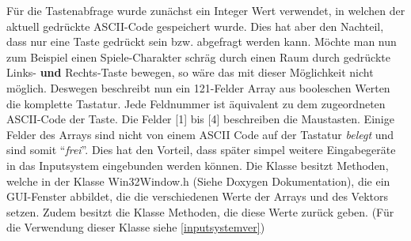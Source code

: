 Für die Tastenabfrage wurde zunächst ein Integer Wert verwendet, in welchen der aktuell gedrückte ASCII-Code gespeichert wurde. Dies hat aber den Nachteil, dass nur eine Taste gedrückt sein bzw. abgefragt werden kann. Möchte man nun zum Beispiel einen Spiele-Charakter schräg durch einen Raum durch gedrückte Links- \textbf{und} Rechts-Taste bewegen, so wäre das mit dieser Möglichkeit nicht möglich. Deswegen beschreibt nun ein 121-Felder Array aus booleschen Werten die komplette Tastatur. Jede Feldnummer ist äquivalent zu dem zugeordneten ASCII-Code der Taste. Die Felder [1] bis [4] beschreiben die Maustasten. Einige Felder des Arrays sind nicht von einem ASCII Code auf der Tastatur \textit{belegt} und sind somit "`\textit{frei}"'. Dies hat den Vorteil, dass später simpel weitere Eingabegeräte in das Inputsystem eingebunden werden können.
Die Klasse besitzt Methoden, welche in der Klasse Win32Window.h (Siehe Doxygen Dokumentation), die ein GUI-Fenster abbildet, die die verschiedenen Werte der Arrays und des Vektors setzen.
Zudem besitzt die Klasse Methoden, die diese Werte zurück geben. (Für die Verwendung dieser Klasse siehe \cref{inputsystemver})